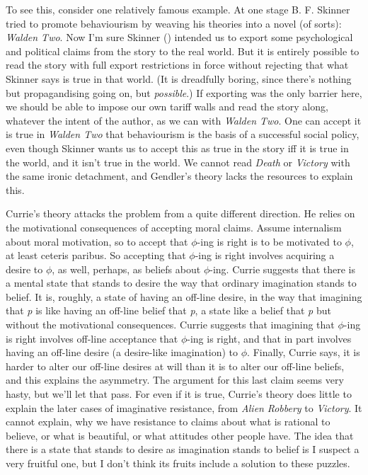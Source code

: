 \documentclass[
  11pt,
  letterpaper,
  DIV=11,
  numbers=noendperiod,
  twoside]{scrartcl}
\begin{document}
To see this, consider one relatively famous example. At one stage B. F.
Skinner tried to promote behaviourism by weaving his theories into a
novel (of sorts): \emph{Walden Two}. Now I'm sure Skinner
() intended us to export some
psychological and political claims from the story to the real world. But
it is entirely possible to read the story with full export restrictions
in force without rejecting that what Skinner says is true in that world.
(It is dreadfully boring, since there's nothing but propagandising going
on, but \emph{possible}.) If exporting was the only barrier here, we
should be able to impose our own tariff walls and read the story along,
whatever the intent of the author, as we can with \emph{Walden Two}. One
can accept it is true in \emph{Walden Two} that behaviourism is the
basis of a successful social policy, even though Skinner wants us to
accept this as true in the story iff it is true in the world, and it
isn't true in the world. We cannot read \emph{Death} or \emph{Victory}
with the same ironic detachment, and Gendler's theory lacks the
resources to explain this.

Currie's theory attacks the problem from a quite different direction. He
relies on the motivational consequences of accepting moral claims.
Assume internalism about moral motivation, so to accept that
\({\phi}\)-ing is right is to be motivated to \({\phi}\), at least
ceteris paribus. So accepting that \({\phi}\)-ing is right involves
acquiring a desire to \({\phi}\), as well, perhaps, as beliefs about
\({\phi}\)-ing. Currie suggests that there is a mental state that stands
to desire the way that ordinary imagination stands to belief. It is,
roughly, a state of having an off-line desire, in the way that imagining
that \emph{p} is like having an off-line belief that \emph{p}, a state
like a belief that \emph{p} but without the motivational consequences.
Currie suggests that imagining that \({\phi}\)-ing is right involves
off-line acceptance that \({\phi}\)-ing is right, and that in part
involves having an off-line desire (a desire-like imagination) to
\({\phi}\). Finally, Currie says, it is harder to alter our off-line
desires at will than it is to alter our off-line beliefs, and this
explains the asymmetry. The argument for this last claim seems very
hasty, but we'll let that pass. For even if it is true, Currie's theory
does little to explain the later cases of imaginative resistance, from
\emph{Alien} \emph{Robbery} to \emph{Victory}. It cannot explain, why we
have resistance to claims about what is rational to believe, or what is
beautiful, or what attitudes other people have. The idea that there is a
state that stands to desire as imagination stands to belief is I suspect
a very fruitful one, but I don't think its fruits include a solution to
these puzzles.
\end{document}

